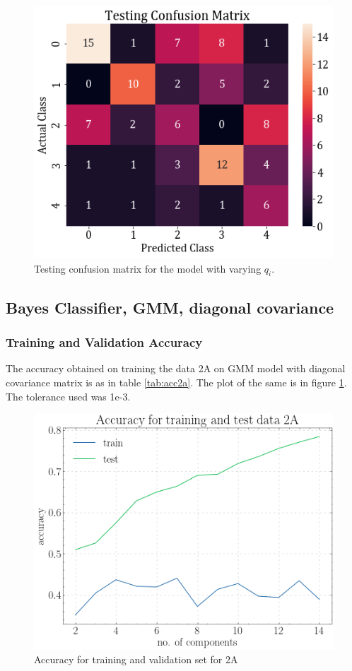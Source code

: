 \documentclass[11pt,a4paper]{article}
\begin{document}
\begin{figure}[H]
    \centering
    \includegraphics[scale=0.5]{images/2a_full_cross_test.png}
    \caption{Testing confusion matrix for the model with varying $q_i$.}
\end{figure}


\subsection{Bayes Classifier, GMM, diagonal covariance}
\subsubsection{Training and Validation Accuracy}
The accuracy obtained on training the data 2A on GMM model with diagonal covariance matrix is as in table \ref{tab:acc2a}. The plot of the same is in figure \ref{fig:acc2adiag}. The tolerance used was 1e-3.


\begin{figure}[H]
    \centering
    \includegraphics[scale = 0.5]{images/acc_2a.png}
    \caption{Accuracy for training and validation set for 2A}
    \label{fig:acc2adiag}
\end{figure}
\end{document}
